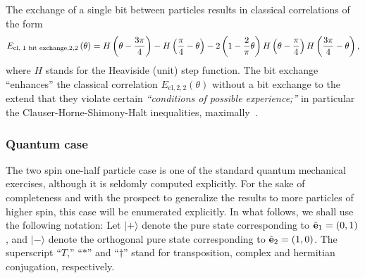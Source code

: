 \documentclass[fleqn,twoside]{article}      %
\begin{document}
The exchange of a single bit between particles results in classical correlations of the form~\cite{svozil-2004-brainteaser}
\begin{equation}
E_{\text{cl, 1 bit exchange},2,2}\left(\theta \right)
=
H\left(\theta - {3 \pi\over 4}\right)
 - H\left({\pi \over 4} - \theta \right)  -
  2\left(1 - {2\over \pi}\theta \right)
H\left(\theta - {\pi\over 4}\right) H\left({3 \pi\over 4} - \theta \right)
,
\label{e-2004-brainteaser-2a}
\end{equation}
where $H$ stands for the Heaviside (unit) step function.
The bit exchange ``enhances'' the classical correlation $E_{\text{cl},2,2}(\theta )$ without a bit exchange to the extend
that they violate certain {\em ``conditions of possible experience;''} in particular
 the Clauser-Horne-Shimony-Halt inequalities, maximally~\cite{popescu-97b}.





\subsubsection{Quantum case}

The two spin one-half particle case is one of the standard quantum mechanical exercises, although
it is seldomly computed explicitly.
For the sake of completeness and with the prospect to generalize the results to more particles of higher spin,
this case will be enumerated explicitly.
In what follows, we shall use the following notation:
Let
$
\vert +\rangle
$
denote the pure state corresponding to
$ {\hat {\bf e}}_1 =(0,1)
$,
and
$
\vert -\rangle $ denote the orthogonal pure state
corresponding to
${\hat {\bf e}}_2 =(1,0)
$.
The superscript
``$T$,''
``$\ast$'' and
``$\dagger$'' stand for transposition, complex and hermitian conjugation, respectively.
\end{document}
